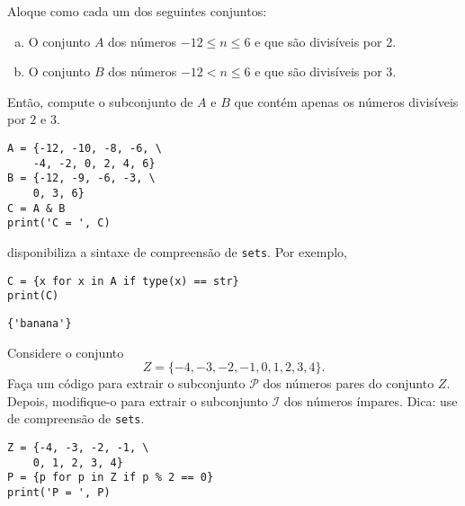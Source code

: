 \begin{exer}
  Aloque como {\PYTHONset} cada um dos seguintes conjuntos:
  \begin{enumerate}[a)]
    \item O conjunto $A$ dos números $-12 \leq n \leq 6$ e que são divisíveis por 2.
    \item O conjunto $B$ dos números $-12 < n \leq 6$ e que são divisíveis por 3.
  \end{enumerate}
  Então, compute o subconjunto de $A$ e $B$ que contém apenas os números divisíveis por $2$ e $3$.
\end{exer}
\begin{resp}
  
\begin{lstlisting}
A = {-12, -10, -8, -6, \
    -4, -2, 0, 2, 4, 6}
B = {-12, -9, -6, -3, \
    0, 3, 6}
C = A & B
print('C = ', C)
\end{lstlisting}

\end{resp}

\begin{obs}\label{obs:compreensão_de_conjuntos}
  {\python} disponibiliza a sintaxe de compreensão de \texttt{sets}. Por exemplo,

\begin{lstlisting}
C = {x for x in A if type(x) == str}
print(C)
\end{lstlisting}

\begin{verbatim}
{'banana'}
\end{verbatim}

\end{obs}

\begin{exer}
  Considere o conjunto
  \begin{equation}
    Z = \{-4, -3, -2, -1, 0, 1, 2, 3, 4\}.
  \end{equation}
  Faça um código {\python} para extrair o subconjunto $\mathcal{P}$ dos números pares do conjunto $Z$. Depois, modifique-o para extrair o subconjunto $\mathcal{I}$ dos números ímpares. Dica: use de compreensão de \texttt{sets}.
\end{exer}
\begin{resp}

\begin{lstlisting}
Z = {-4, -3, -2, -1, \
    0, 1, 2, 3, 4}
P = {p for p in Z if p % 2 == 0}
print('P = ', P)
\end{lstlisting}

\end{resp}


